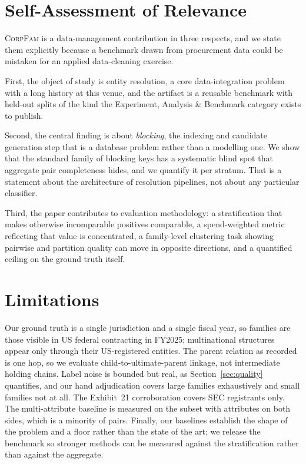 \section{Self-Assessment of Relevance}

\textsc{CorpFam} is a data-management contribution in three respects, and we state them
explicitly because a benchmark drawn from procurement data could be mistaken for an
applied data-cleaning exercise.

First, the object of study is entity resolution, a core data-integration problem with a
long history at this venue, and the artifact is a reusable benchmark with held-out splits
of the kind the Experiment, Analysis \& Benchmark category exists to publish.

Second, the central finding is about \emph{blocking}, the indexing and candidate
generation step that is a database problem rather than a modelling one. We show that the
standard family of blocking keys has a systematic blind spot that aggregate pair
completeness hides, and we quantify it per stratum. That is a statement about the
architecture of resolution pipelines, not about any particular classifier.

Third, the paper contributes to evaluation methodology: a stratification that makes
otherwise incomparable positives comparable, a spend-weighted metric reflecting that value
is concentrated, a family-level clustering task showing pairwise and partition quality can
move in opposite directions, and a quantified ceiling on the ground truth itself.

\section{Limitations}

Our ground truth is a single jurisdiction and a single fiscal year, so families are those
visible in US federal contracting in FY2025; multinational structures appear only through
their US-registered entities. The parent relation as recorded is one hop, so we evaluate
child-to-ultimate-parent linkage, not intermediate holding chains. Label noise is bounded
but real, as Section~\ref{sec:quality} quantifies, and our hand adjudication covers large
families exhaustively and small families not at all. The Exhibit~21 corroboration covers
SEC registrants only. The multi-attribute baseline is measured on the subset with
attributes on both sides, which is a minority of pairs. Finally, our baselines establish
the shape of the problem and a floor rather than the state of the art; we release the
benchmark so stronger methods can be measured against the stratification rather than
against the aggregate.

